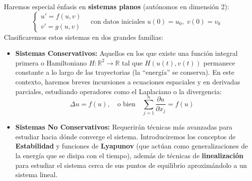 Haremos especial énfasis en \textbf{sistemas planos} (autónomos en dimensión 2):
\[
    \begin{cases}
        u' = f(u,v) \\
        v' = g(u,v) 
    \end{cases} \quad \text{con datos iniciales } u(0) = u_0, \; v(0) = v_0
\]
Clasificaremos estos sistemas en dos grandes familias:
\begin{itemize}
    \item \textbf{Sistemas Conservativos:} Aquellos en los que existe una función integral primera o Hamiltoniano $H : \mathbb{R}^2 \to \mathbb{R}$ tal que $H(u(t), v(t))$ permanece constante a lo largo de las trayectorias (la ``energía'' se conserva). En este contexto, haremos breves incursiones a ecuaciones espaciales y en derivadas parciales, estudiando operadores como el Laplaciano o la divergencia:
    \[
        \Delta u = f(u), \quad \text{o bien} \quad \sum_{j=1}^n \frac{\partial u}{\partial x_j} = f(u)
    \]
    \item \textbf{Sistemas No Conservativos:} Requerirán técnicas más avanzadas para estudiar hacia dónde converge el sistema. Introduciremos los conceptos de \textbf{Estabilidad} y funciones de \textbf{Lyapunov} (que actúan como generalizaciones de la energía que se disipa con el tiempo), además de técnicas de \textbf{linealización} para estudiar el sistema cerca de sus puntos de equilibrio aproximándolo a un sistema lineal.
\end{itemize}